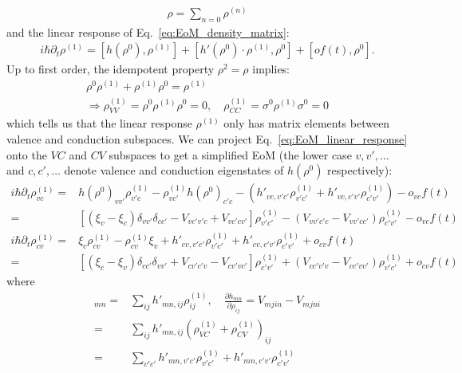 \documentclass[11pt,letterpaper]{article}
\theoremstyle{definition}
\theoremstyle{plain}
\theoremstyle{remark}
\newcommand{\pfpx}[2]{\frac{\partial #1}{\partial #2}} %
\begin{document}
\begin{gather}
    \rho = \sum_{n=0} \rho^{(n)}
\end{gather}
and the linear response of Eq.~\eqref{eq:EoM_density_matrix}:
\begin{gather}
    i\hbar \partial_t \rho^{(1)} = [h(\rho^0), \rho^{(1)}] + [h'(\rho^0)\cdot\rho^{(1)}, \rho^0] + [o f(t), \rho^0]. \label{eq:EoM_linear_response}
\end{gather}
Up to first order, the idempotent property $\rho^2 = \rho$ implies:
\begin{gather}
    \rho^0 \rho^{(1)} + \rho^{(1)} \rho^0 = \rho^{(1)} \\
    \Rightarrow \rho^{(1)}_{VV} = \rho^0 \rho^{(1)} \rho^0 = 0, \quad \rho^{(1)}_{CC} = \sigma^0 \rho^{(1)} \sigma^0 = 0
\end{gather}
which tells us that the linear response $\rho^{(1)}$ only has matrix elements between valence and conduction subspaces. We can project Eq.~\eqref{eq:EoM_linear_response} onto the $VC$ and $CV$ subspaces to get a simplified EoM (the lower case $v,v',\dots$ and $c,c',\dots$ denote valence and conduction eigenstates of $h(\rho^0)$ respectively):
\begin{align}
    i\hbar \partial_t \rho_{vc}^{(1)} =& h(\rho^0)_{vv'} \rho^{(1)}_{v'c} - \rho^{(1)}_{vc'} h(\rho^0)_{c' c} -(h'_{vc, v'c'} \rho^{(1)}_{v'c'} + h'_{vc, c'v'}\rho^{(1)}_{c' v'}) - o_{vc} f(t) \\
    =& \left[(\xi_{v} - \xi_c)\delta_{vv'} \delta_{cc'} - V_{vc'v'c} + V_{vc'cv'}\right]\rho^{(1)}_{v'c'} - \left(V_{vv'c'c} - V_{vv'cc'}\right) \rho^{(1)}_{c'v'} - o_{vc} f(t) \label{eq:EoM_VC_Block} \\[1.5em]
    i\hbar \partial_t \rho_{cv}^{(1)} =& \xi_c \rho^{(1)}_{cv} - \rho^{(1)}_{cv} \xi_v + h'_{cv, v'c'} \rho^{(1)}_{v'c'} + h'_{cv, c'v'} \rho^{(1)}_{c'v'} + o_{cv} f(t) \\
    =& \left[(\xi_c - \xi_v)\delta_{cc'}\delta_{vv'} + V_{cv'c'v} - V_{cv'vc'}\right] \rho^{(1)}_{c'v'} + (V_{cc'v'v} - V_{cc'vv'}) \rho^{(1)}_{v'c'} + o_{cv} f(t) \label{eq:EoM_CV_Block}
\end{align}
where
\begin{align}
    [h'(\rho^0) \cdot \rho^{(1)}]_{mn} =& \sum_{ij} h'_{mn, ij} \rho^{(1)}_{ij} ,\quad \pfpx{h_{mn}}{\rho_{ij}} = V_{mjin} - V_{mjni} \\
    =& \sum_{ij} h'_{mn, ij} \left(\rho^{(1)}_{VC} + \rho^{(1)}_{CV} \right)_{ij} \\
    =& \sum_{v' c'} h'_{mn, v'c'} \rho^{(1)}_{v'c'} + h'_{mn, c'v'} \rho^{(1)}_{c'v'}
\end{align}
\end{document}
